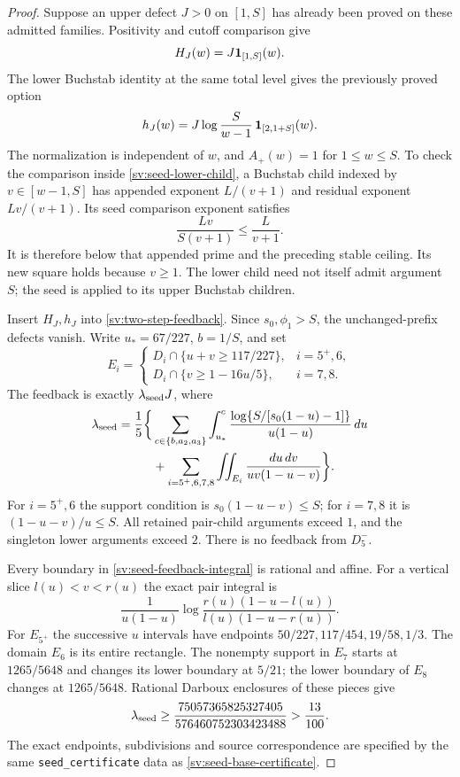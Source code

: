 \begin{proof}
Suppose an upper defect $J>0$ on $[1,S]$ has already been proved on
these admitted families. Positivity and cutoff comparison give
\[
 H_J(w)=J\mathbf 1_{[1,S]}(w).
\]
The lower Buchstab identity at the same total level gives the
previously proved option
\begin{equation}\label{sv:seed-lower-child}
 h_J(w)=J\log\frac{S}{w-1}\,
                    \mathbf 1_{[2,1+S]}(w).
\end{equation}
The normalization is independent of $w$, and $A_+(w)=1$ for
$1\le w\le S$. To check the comparison inside
\eqref{sv:seed-lower-child}, a Buchstab child indexed by
$v\in[w-1,S]$ has appended exponent $L/(v+1)$ and residual
exponent $Lv/(v+1)$. Its seed comparison exponent satisfies
\[
 \frac{Lv}{S(v+1)}\le\frac{L}{v+1}.
\]
It is therefore below that appended prime and the preceding stable
ceiling. Its new square holds because $v\ge1$. The lower child
need not itself admit argument $S$; the seed is applied to its
upper Buchstab children.

Insert $H_J,h_J$ into \eqref{sv:two-step-feedback}. Since
$s_0,\phi_1>S$, the unchanged-prefix defects vanish. Write
$u_*=67/227$, $b=1/S$, and set
\[
 E_i=\begin{cases}
 D_i\cap\{u+v\ge117/227\},&i=5^+,6,\\
 D_i\cap\{v\ge1-16u/5\},&i=7,8.
 \end{cases}
\]
The feedback is exactly $\lambda_{\rm seed} J$, where
\begin{align}\label{sv:seed-feedback-integral}
 \lambda_{\rm seed}=\frac15\bigg\{&
 \sum_{c\in\{b,a_2,a_3\}}
 \int_{u_*}^{c}
 \frac{\log\{S/[s_0(1-u)-1]\}}{u(1-u)}\,du\notag\\
 &+\sum_{i=5^+,6,7,8}\iint_{E_i}
                     \frac{du\,dv}{uv(1-u-v)}\bigg\}.
\end{align}
For $i=5^+,6$ the support condition is
$s_0(1-u-v)\le S$; for $i=7,8$ it is
$(1-u-v)/u\le S$. All retained pair-child arguments exceed $1$,
and the singleton lower arguments exceed $2$. There is no
feedback from $D_5^-$.

Every boundary in \eqref{sv:seed-feedback-integral} is rational
and affine. For a vertical slice $l(u)<v<r(u)$ the exact pair
integral is
\[
 \frac1{u(1-u)}
 \log\frac{r(u)(1-u-l(u))}{l(u)(1-u-r(u))}.
\]
For $E_{5^+}$ the successive $u$ intervals have endpoints
$50/227,117/454,19/58,1/3$. The domain $E_6$ is its entire
rectangle. The nonempty support in $E_7$ starts at $1265/5648$
and changes its lower boundary at $5/21$; the lower boundary of
$E_8$ changes at $1265/5648$. Rational Darboux enclosures of
these pieces give
\begin{equation}\label{sv:seed-feedback-certificate}
 \lambda_{\rm seed}\ge
 \frac{75057365825327405}{576460752303423488}
 >\frac{13}{100}.
\end{equation}
The exact endpoints, subdivisions and source correspondence are
specified by the same \texttt{seed\_certificate} data as
\eqref{sv:seed-base-certificate}.


\end{proof}
